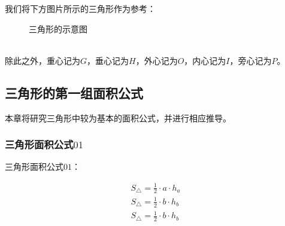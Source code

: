 \documentclass[UTF8]{ctexart}
\begin{document}
    我们将下方图片所示的三角形作为参考：
    \begin{figure}[h]
        \begin{center}
            \caption{三角形的示意图}
        \end{center}
    \end{figure}\\
    除此之外，重心记为$G$，垂心记为$H$，外心记为$O$，内心记为$I$，旁心记为$P$。

\newpage

\subsection{三角形的第一组面积公式}
    本章将研究三角形中较为基本的面积公式，并进行相应推导。

\subsubsection{三角形面积公式$01$}
    三角形面积公式$01$：
    \begin{large}
        \begin{align*}
            S_{\triangle}=\frac{1}{2}\cdot a\cdot h_a\\[2mm]
            S_{\triangle}=\frac{1}{2}\cdot b\cdot h_b\\[2mm]
            S_{\triangle}=\frac{1}{2}\cdot b\cdot h_b
        \end{align*}
    \end{large}\vspace{-20pt}
\end{document}
